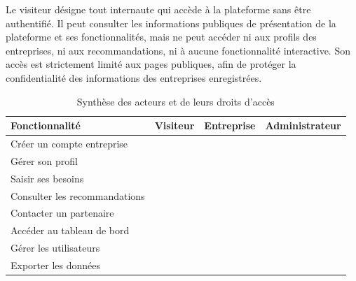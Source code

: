 \documentclass[12pt, a4paper, oneside]{report}
\begin{document}
	Le visiteur désigne tout internaute qui accède à la plateforme
	sans être authentifié. Il peut consulter les informations
	publiques de présentation de la plateforme et ses fonctionnalités,
	mais ne peut accéder ni aux profils des entreprises, ni aux
	recommandations, ni à aucune fonctionnalité interactive. Son
	accès est strictement limité aux pages publiques, afin de
	protéger la confidentialité des informations des entreprises
	enregistrées.
	
	\begin{table}[H]
		\centering
		\caption{Synthèse des acteurs et de leurs droits d'accès}
		\label{tab:acteurs}
		\renewcommand{\arraystretch}{1.5}
		\begin{tabularx}{\textwidth}{>{\raggedright\arraybackslash}p{3cm}
				>{\centering\arraybackslash}p{2.2cm}
				>{\centering\arraybackslash}p{2.2cm}
				>{\centering\arraybackslash}X}
			\toprule
			\rowcolor{primary!15}
			\textbf{Fonctionnalité}
			& \textbf{Visiteur}
			& \textbf{Entreprise}
			& \textbf{Administrateur} \\
			\midrule
			
			\rowcolor{lightgray}
			Créer un compte entreprise
			& \textcolor{green!60!black}{\checkmark}
			& \textcolor{green!60!black}{\checkmark}
			& \textcolor{green!60!black}{\checkmark} \\
			
			Gérer son profil
			& \textcolor{accent}{\texttimes}
			& \textcolor{green!60!black}{\checkmark}
			& \textcolor{green!60!black}{\checkmark} \\
			
			\rowcolor{lightgray}
			Saisir ses besoins
			& \textcolor{accent}{\texttimes}
			& \textcolor{green!60!black}{\checkmark}
			& \textcolor{green!60!black}{\checkmark} \\
			
			Consulter les recommandations
			& \textcolor{accent}{\texttimes}
			& \textcolor{green!60!black}{\checkmark}
			& \textcolor{green!60!black}{\checkmark} \\
			
			\rowcolor{lightgray}
			Contacter un partenaire
			& \textcolor{accent}{\texttimes}
			& \textcolor{green!60!black}{\checkmark}
			& \textcolor{green!60!black}{\checkmark} \\
			
			\rowcolor{lightgray}
			Accéder au tableau de bord
			& \textcolor{accent}{\texttimes}
			& \textcolor{accent}{\texttimes}
			& \textcolor{green!60!black}{\checkmark} \\
			
			Gérer les utilisateurs
			& \textcolor{accent}{\texttimes}
			& \textcolor{accent}{\texttimes}
			& \textcolor{green!60!black}{\checkmark} \\
			
			\rowcolor{lightgray}
			Exporter les données
			& \textcolor{accent}{\texttimes}
			& \textcolor{accent}{\texttimes}
			& \textcolor{green!60!black}{\checkmark} \\
			
			\bottomrule
		\end{tabularx}
	\end{table}
	
\end{document}
